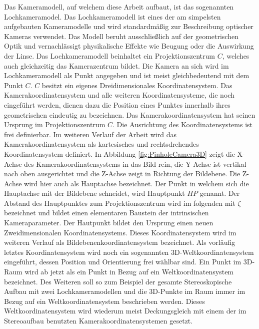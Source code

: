 Das Kameramodell, auf welchem diese Arbeit aufbaut, ist das sogenannten Lochkameramodel. Das Lochkameramodell ist eines der am simpelsten aufgebauten Kameramodelle und wird standardmäßig zur Beschreibung optischer Kameras verwendet. Das Modell beruht ausschließlich auf der geometrischen Optik und vernachlässigt physikalische Effekte wie Beugung oder die Auswirkung der Linse\cite{Heipke}. Das Lochkameramodell beinhaltet ein Projektionszentrum $C$, welches auch gleichzeitig das Kamerazentrum bildet. Die Kamera an sich wird im Lochkameramodell als Punkt angegeben und ist meist gleichbedeutend mit dem Punkt $C$. $C$ besitzt ein eigenes Dreidimensionales Koordinatensystem. Das Kamerakoordinatensystem und alle weiteren Koordinatensysteme, die noch eingeführt werden, dienen dazu die Position eines Punktes innerhalb ihres geometrischen eindeutig zu bezeichnen. Das Kamerakoordinatensystem hat seinen Ursprung im Projektionszentrum $C$. Die Ausrichtung des Koordinatensystems ist frei definierbar. Im weiteren Verlauf der Arbeit wird das Kamerakoordinatensystem als kartesisches und rechtsdrehendes Koordinatensystem definiert. In Abbildung \ref{fig:PinholeCamera3D} zeigt die X-Achse des Kamerakoordinatensystems in das Bild rein, die Y-Achse ist vertikal nach oben ausgerichtet und die Z-Achse zeigt in Richtung der Bildebene. Die Z-Achse wird hier auch als Hauptachse bezeichnet. Der Punkt in welchem sich die Hauptachse mit der Bildebene schneidet, wird Hauptpunkt $HP$ genannt. Der Abstand des Hauptpunktes zum Projektionszentrum wird im folgenden mit $\zeta$ bezeichnet und bildet einen elementaren Baustein der intrinsischen Kameraparameter. Der Hautpunkt bildet den Ursprung einen neuen Zweidimensionalen Koordinatensystems. Dieses Koordinatensystem wird im weiteren Verlauf als Bildebenenkoordinatensystem bezeichnet\cite{HZ}. Als vorläufig letztes Koordinatensystem wird noch ein sogenannten 3D-Weltkoordinatensystem eingeführt, dessen Position und Orientierung frei wählbar sind. Ein Punkt im 3D-Raum wird ab jetzt als ein Punkt in Bezug auf ein Weltkoordinatensystem bezeichnet. Des Weiteren soll so zum Beispiel der gesamte Stereoskopische Aufbau mit zwei Lochkameramodellen und die 3D-Punkte im Raum immer im Bezug auf ein Weltkoordinatensystem beschrieben werden. Dieses Weltkoordinatensystem wird wiederum meist Deckungsgleich mit einem der im Stereoaufbau benutzten Kamerakoordinatensystemen gesetzt.


